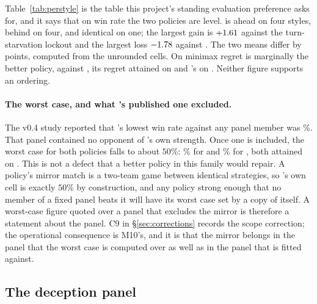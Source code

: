 Table~\ref{tab:perstyle} is the table this project's standing evaluation
preference asks for, and it says that on win rate the two policies are level.
\vfive{} is ahead on four styles, behind on four, and identical on one; the
largest gain is $+1.61$ against the turn-starvation lockout and the
largest loss $-1.78$ against \vtwo{}. The two means differ by
\numStyleMeanGap{} points, computed from the unrounded cells. On minimax regret \vfour{} is marginally the
better policy, \numVfourRegret{} against \numVfiveRegret{}, its regret attained on
\numVfourRegretOpp{} and \vfive{}'s on \numVfiveRegretOpp{}. Neither figure
supports an ordering.

\paragraph{The worst case, and what \vfour{}'s published one excluded.} The v0.4
study reported that \vfour{}'s lowest win rate against any panel member was
\numVfourVsVthree\%. That panel contained no opponent of \vfour{}'s own strength.
Once one is included, the worst case for both policies falls to about $50\%$:
\numVfiveWorst\% for \vfive{} and \numVfourWorst\% for \vfour{}, both attained on
\numVfiveWorstOpp{}. This is not a defect that a better policy in this family
would repair. A policy's mirror match is a two-team game between identical
strategies, so \vfour{}'s own cell is exactly $50\%$ by construction, and any
policy strong enough that no member of a fixed panel beats it will have its worst
case set by a copy of itself. A worst-case figure quoted over a panel that
excludes the mirror is therefore a statement about the panel. C9 in
\S\ref{sec:corrections} records the scope correction; the operational consequence
is M10's, and it is that the mirror belongs in the panel that the worst case is
computed over as well as in the panel that is fitted against.

\subsection{The deception panel}
\label{sec:results-deception}

